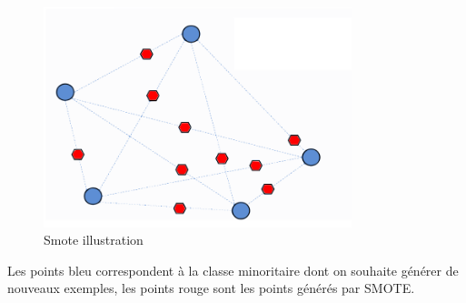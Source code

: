 \documentclass[a4paper,12pt]{article}
\begin{document}
\begin{figure}[h!]
    \centering
    \includegraphics[width=0.8\textwidth]{images/smote.png}
    \caption{Smote illustration}
    \label{fig:example}
\end{figure}
Les points bleu correspondent à la classe minoritaire dont on souhaite générer de nouveaux exemples, les points rouge sont les points générés par SMOTE.


\newpage

\printbibliography
\end{document}
